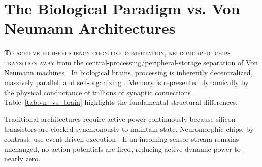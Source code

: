 \documentclass[11pt]{article}
\newcommand{\sectionlead}[2]{\noindent\lettrine[lines=2,lhang=0.08,nindent=0.12em]{\textcolor{IEEEblue}{\bfseries #1}}{\hspace{0.03em}#2}}
\begin{document}
\section{The Biological Paradigm vs. Von Neumann Architectures}
\sectionlead{T}{o achieve high-efficiency cognitive computation, neuromorphic chips transition away} from the central-processing/peripheral-storage separation of Von Neumann machines \cite{schuman2017survey}. In biological brains, processing is inherently decentralized, massively parallel, and self-organizing \cite{schuman2017survey,mead1990neuromorphic}. Memory is represented dynamically by the physical conductance of trillions of synaptic connections \cite{schuman2017survey}. Table~\ref{tab:vn_vs_brain} highlights the fundamental structural differences.

\begin{table}[htbp]
    \centering
    \caption{Key Structural Differences: Von Neumann vs. Human Brain Paradigms \cite{schuman2017survey,mead1990neuromorphic,kudithipudi2025scale}}
    \label{tab:vn_vs_brain}
\end{table}

Traditional architectures require active power continuously because silicon transistors are clocked synchronously to maintain state. Neuromorphic chips, by contrast, use event-driven execution \cite{schuman2017survey,mead1990neuromorphic}. If an incoming sensor stream remains unchanged, no action potentials are fired, reducing active dynamic power to nearly zero.
\end{document}
